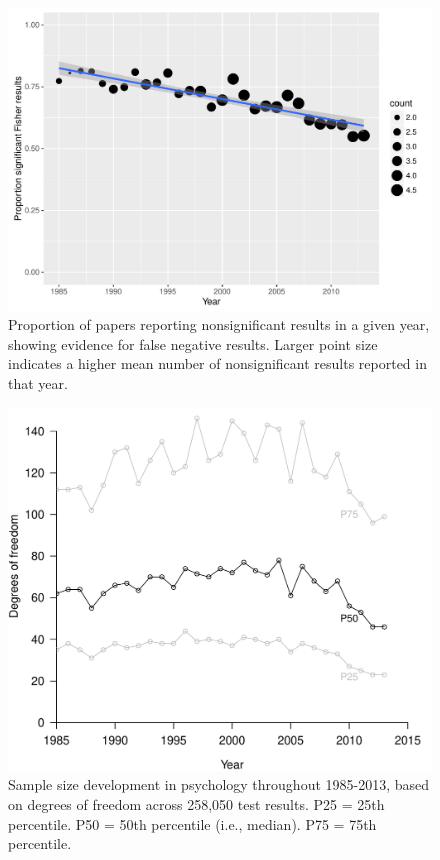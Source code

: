 \documentclass{article}
\begin{document}
\begin{figure}
\begin{center}
\includegraphics{../figures/Fig4.pdf}
\end{center}
\caption{Proportion of papers reporting nonsignificant results in a given year, showing evidence for false negative results. Larger point size indicates a higher mean number of nonsignificant results reported in that year.}
\label{fig:fig4}
\end{figure}

\begin{figure}
\begin{center}
\includegraphics{../figures/Fig5.pdf}
\end{center}
\caption{Sample size development in psychology throughout 1985-2013, based on degrees of freedom across 258,050 test results. P25 = 25th percentile. P50 = 50th percentile (i.e., median). P75 = 75th percentile.}
\label{fig:fig5}
\end{figure}
\end{document}
